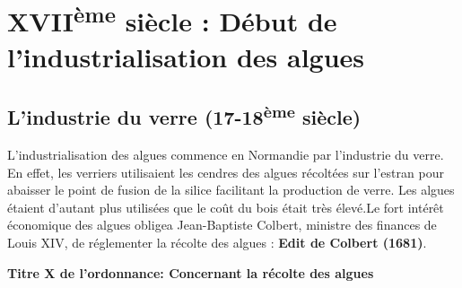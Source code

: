 \documentclass[
]{book}
\begin{document}
\hypertarget{xviiuxe8me-siuxe8cle-duxe9but-de-lindustrialisation-des-algues}{%
\section{\texorpdfstring{XVII\textsuperscript{ème} siècle : Début de l'industrialisation des algues}{XVIIème siècle : Début de l'industrialisation des algues}}\label{xviiuxe8me-siuxe8cle-duxe9but-de-lindustrialisation-des-algues}}

\hypertarget{lindustrie-du-verre-17-18uxe8me-siuxe8cle}{%
\subsection{\texorpdfstring{L'industrie du verre (17-18\textsuperscript{ème} siècle)}{L'industrie du verre (17-18ème siècle)}}\label{lindustrie-du-verre-17-18uxe8me-siuxe8cle}}

L'industrialisation des algues commence en Normandie par l'industrie du verre. En effet, les verriers utilisaient les cendres des algues récoltées sur l'estran pour abaisser le point de fusion de la silice facilitant la production de verre. Les algues étaient d'autant plus utilisées que le coût du bois était très élevé.Le fort intérêt économique des algues obligea Jean-Baptiste Colbert, ministre des finances de Louis XIV, de réglementer la récolte des algues : \textbf{Edit de Colbert (1681)}.

\textbf{Titre X de l'ordonnance: Concernant la récolte des algues}
\end{document}
